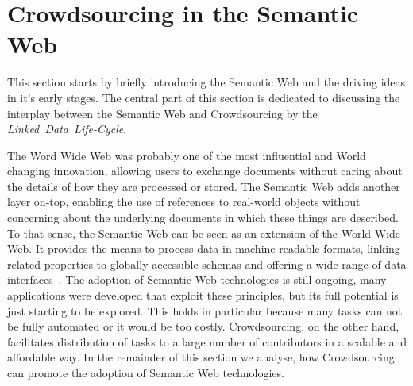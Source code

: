 \section{Crowdsourcing in the Semantic Web}\label{sec:state_of_the_art_crowdsourcing_and_the_semantic_web}
This section starts by briefly introducing the Semantic Web and the driving ideas in it's early stages. The central part of this section is dedicated to discussing the interplay between the Semantic Web and Crowdsourcing by the \textit{Linked~Data~Life-Cycle}. 

The Word Wide Web was probably one of the most influential and World changing innovation, allowing users to exchange documents without caring about the details of how they are processed or stored. The Semantic Web adds another layer on-top, enabling the use of references to real-world objects without concerning about the underlying documents in which these things are described. To that sense, the Semantic Web can be seen as an extension of the World Wide Web. It provides the means to process data in machine-readable formats, linking related properties to globally accessible schemas and offering a wide range of data interfaces~\cite{hendler2010}.
The adoption of Semantic Web technologies is still ongoing, many applications were developed that exploit these principles, but its full potential is just starting to be explored. This holds in particular because many tasks can not be fully automated or it would be too costly. Crowdsourcing, on the other hand, facilitates distribution of tasks to a large number of contributors in a scalable and affordable way. In the remainder of this section we analyse, how Crowdsourcing can promote the adoption of Semantic Web technologies. 

